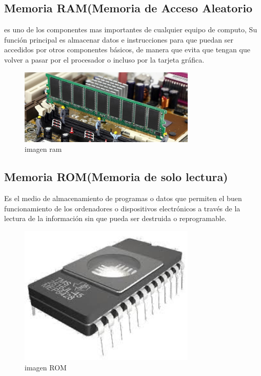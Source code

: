 \documentclass{article}
\begin{document}
\subsection*{Memoria RAM(Memoria de Acceso Aleatorio}
es uno de los componentes mas importantes de cualquier equipo de computo, Su función principal es almacenar datos e instrucciones para que puedan ser accedidos por otros componentes básicos, de manera que evita que tengan que volver a pasar por el procesador o incluso por la tarjeta gráfica.\\[2cm]
\begin{figure}[!]
    \centering
    \includegraphics[width=0.75\textwidth]{ram.jpg}
    \caption{imagen ram}
    \label{fig:my_label}
\end{figure}
\subsection*{Memoria ROM(Memoria de solo lectura)}
Es el medio de almacenamiento de programas o datos que permiten el buen funcionamiento de los ordenadores o dispositivos electrónicos a través de la lectura de la información sin que pueda ser destruida o reprogramable.\\[0.1cm]
\begin{figure}[h]
    \centering
    \includegraphics[width=0.75\textwidth]{rom.jpg}
    \caption{imagen ROM}
    \label{fig:my_label}
\end{figure}
\end{document}
